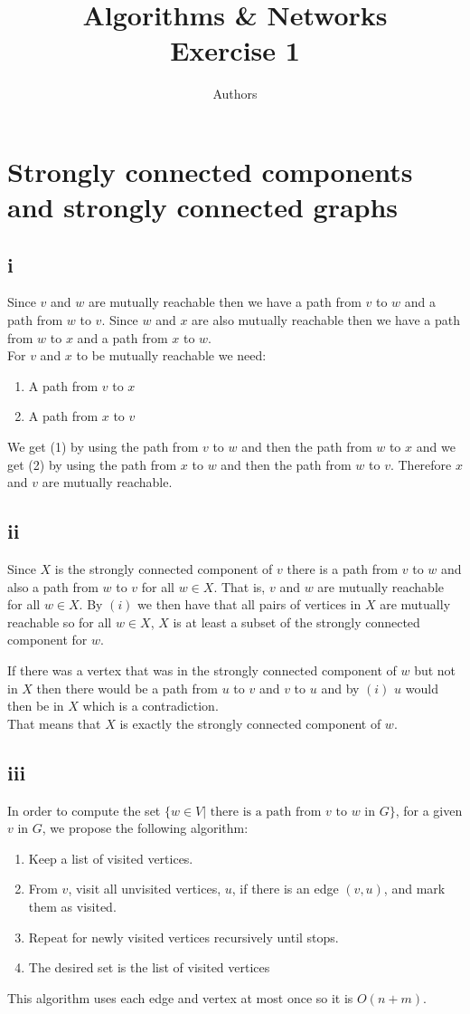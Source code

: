 \documentclass[a4paper]{article}
\author{Authors}
\title{Algorithms \& Networks \\ Exercise 1}
\begin{document}
\maketitle
\section{Strongly connected components and strongly connected graphs}
\subsection*{i}
Since $v$ and $w$ are mutually reachable then we have a path from $v$ to $w$ and a path from $w$ to $v$. Since $w$ and $x$ are also mutually reachable then we have a path from $w$ to $x$ and a path from $x$ to $w$.\\
For $v$ and $x$ to be mutually reachable we need:
\begin{enumerate}
  \item A path from $v$ to $x$
  \item A path from $x$ to $v$
\end{enumerate}
We get (1) by using the path from $v$ to $w$ and then the path from $w$ to $x$ and we get (2) by using the path from $x$ to $w$ and then the path from $w$ to $v$. Therefore $x$ and $v$ are mutually reachable.

\subsection*{ii}
Since $X$ is the strongly connected component of $v$ there is a path from $v$ to $w$ and also a path from $w$ to $v$ for all $w \in X$. That is, $v$ and $w$ are mutually reachable for all $w \in X$. By $(i)$ we then have that all pairs of vertices in $X$ are mutually reachable so for all $w \in X$, $X$ is at least a subset of the strongly connected component for $w$.

If there was a vertex that was in the strongly connected component of $w$ but not in $X$ then there would be a path from $u$ to $v$ and $v$ to $u$ and by $(i)$ $u$ would then be in $X$ which is a contradiction. \\
That means that $X$ is exactly the strongly connected component of $w$.
\subsection*{iii}
In order to compute the set $\{w \in V | \mbox{ there is a path from $v$ to $w$ in $G$}\}$, for a given $v$ in $G$, we propose the following algorithm:
\begin{enumerate}
  \item Keep a list of visited vertices.
  \item From $v$, visit all unvisited vertices, $u$, if there is an edge $(v,u)$, and mark them as visited.
  \item Repeat for newly visited vertices recursively until stops.
  \item The desired set is the list of visited vertices
\end{enumerate}
This algorithm uses each edge and vertex at most once so it is $O(n + m)$.
\end{document}
